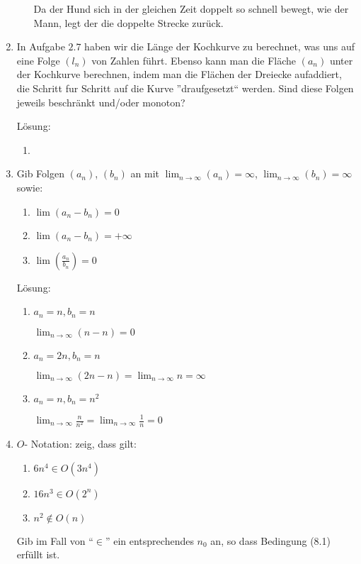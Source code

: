 \documentclass[main.tex]{subfiles}
\begin{document}
\begin{enumerate}
\begin{enumerate}
		            Da der Hund sich in der gleichen Zeit doppelt so schnell bewegt, wie der Mann, legt der die doppelte Strecke zurück.
	      \end{enumerate}
	\item  In Aufgabe \( 2.7 \) haben wir die Länge der Kochkurve zu berechnet, was uns auf
	      eine Folge \( (l_n) \) von Zahlen führt. Ebenso kann man die Fläche \( (a_n) \) unter der
	      Kochkurve berechnen, indem man die Flächen der Dreiecke aufaddiert, die
	      Schritt fur Schritt auf die Kurve ”draufgesetzt“ werden.
	      Sind diese Folgen jeweils beschränkt und/oder monoton?

	      Lösung:
	      \begin{enumerate}
		      \item
	      \end{enumerate}
	\item Gib Folgen \( (a_n) \), \( (b_n) \) an mit \( \lim_{n \to \infty}(a_n) = \infty \),
	      \( \lim_{n \to \infty}(b_n) = \infty \) sowie:
	      \begin{enumerate}
		      \item \( \lim(a_n - b_n) = 0 \)
		      \item \( \lim(a_n - b_n) = + \infty \)
		      \item \( \lim( \frac{a_n}{b_n}) = 0 \)
	      \end{enumerate}

	      Lösung:
	      \begin{enumerate}
		      \item \( a_n = n, b_n = n \)

		            \( \lim_{n \to \infty} (n - n) = 0 \)
		      \item \( a_n = 2n, b_n = n \)

		            \( \lim_{n \to \infty} (2n - n) = \lim_{n \to \infty} n = \infty \)
		      \item \( a_n = n, b_n = n^2 \)

		            \( \lim_{n \to \infty} \frac{n}{n^2} = \lim_{n \to \infty} \frac{1}{n} = 0  \)
	      \end{enumerate}
	\item \( O \)- Notation: zeig, dass gilt:
	      \begin{enumerate}
		      \item \( 6n^4  \in O(3n^4) \)
		      \item \( 16n^3 \in O(2^n) \)
		      \item \( n^2 \notin O(n) \)
	      \end{enumerate}
	      Gib im Fall von "`\( \in \)"' ein entsprechendes \( n_0 \) an, so dass Bedingung
	      (8.1) erfüllt ist.


\end{enumerate}
\end{document}
